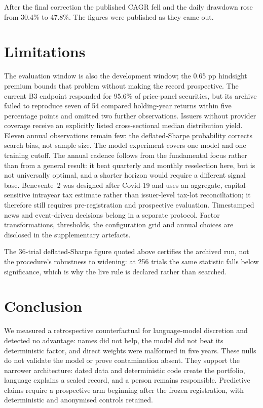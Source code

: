 \documentclass[10pt,conference]{IEEEtran}
\begin{document}
After the final correction the published CAGR fell and the daily drawdown rose from 30.4\% to 47.8\%. The figures were published as they came out.

\section{Limitations}

The evaluation window is also the development window; the 0.65 pp hindsight premium bounds that problem without making the record prospective. The current B3 endpoint responded for 95.6\% of price-panel securities, but its archive failed to reproduce seven of 54 compared holding-year returns within five percentage points and omitted two further observations. Issuers without provider coverage receive an explicitly listed cross-sectional median distribution yield. Eleven annual observations remain few: the deflated-Sharpe probability corrects search bias, not sample size. The model experiment covers one model and one training cutoff. The annual cadence follows from the fundamental focus rather than from a general result: it beat quarterly and monthly reselection here, but is not universally optimal, and a shorter horizon would require a different signal base. Benevente~2 was designed after Covid-19 and uses an aggregate, capital-sensitive intrayear tax estimate rather than issuer-level tax-lot reconciliation; it therefore still requires pre-registration and prospective evaluation. Timestamped news and event-driven decisions belong in a separate protocol. Factor transformations, thresholds, the configuration grid and annual choices are disclosed in the supplementary artefacts.

The 36-trial deflated-Sharpe figure quoted above certifies the archived run, not the procedure's robustness to widening: at 256 trials the same statistic falls below significance, which is why the live rule is declared rather than searched.

\section{Conclusion}

We measured a retrospective counterfactual for language-model discretion and detected no advantage: names did not help, the model did not beat its deterministic factor, and direct weights were malformed in five years. These nulls do not validate the model or prove contamination absent. They support the narrower architecture: dated data and deterministic code create the portfolio, language explains a sealed record, and a person remains responsible. Predictive claims require a prospective arm beginning after the frozen registration, with deterministic and anonymised controls retained.
\end{document}
